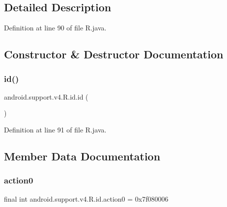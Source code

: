 \subsection{Detailed Description}


Definition at line 90 of file R.\+java.



\subsection{Constructor \& Destructor Documentation}
\mbox{\label{classandroid_1_1support_1_1v4_1_1_r_1_1id_a41674462355e6ba38d31dbbabe96adc1}} 
\subsubsection{\texorpdfstring{id()}{id()}}
{\footnotesize\ttfamily android.\+support.\+v4.\+R.\+id.\+id (\begin{DoxyParamCaption}{ }\end{DoxyParamCaption})\hspace{0.3cm}{\ttfamily [private]}}



Definition at line 91 of file R.\+java.


\begin{DoxyCode}{0}

\end{DoxyCode}


\subsection{Member Data Documentation}
\mbox{\label{classandroid_1_1support_1_1v4_1_1_r_1_1id_ad7592f41400f9252a235131ada4828fb}} 
\subsubsection{\texorpdfstring{action0}{action0}}
{\footnotesize\ttfamily final int android.\+support.\+v4.\+R.\+id.\+action0 = 0x7f080006\hspace{0.3cm}{\ttfamily [static]}}



